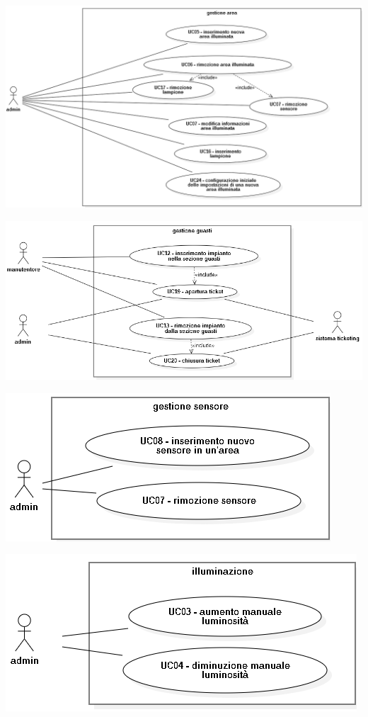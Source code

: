 \documentclass[12pt]{article}
\begin{document}
\includegraphics[scale=0.5]{gestione area.png}	

\includegraphics[scale=0.5]{gestione guasti.png}	

\includegraphics[scale=0.5]{gestione sensore.png}	

\includegraphics[scale=0.5]{illuminazione.png}	
\end{document}
